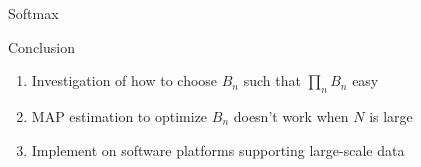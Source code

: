 \documentclass[final]{beamer}
\newlength{\onecolwid}
\begin{document}
\begin{frame}[t]
\begin{columns}[t]
\begin{column}{\onecolwid}
\begin{block}{Softmax}
\end{block}



\begin{block}{Conclusion}

\begin{enumerate}
  \item Investigation of how to choose $B_n$ such that $\prod_n B_n$ easy
  \item MAP estimation to optimize $B_n$ doesn't work when $N$ is large
  \item Implement on software platforms supporting large-scale data
\end{enumerate}

\end{block}


\end{column} %

\end{columns} %

\end{frame} %
\end{document}
